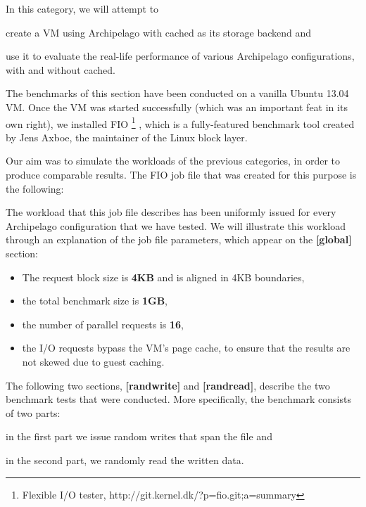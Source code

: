 In this category, we will attempt to
\begin{inparaenum}[i)]
	\item create a VM using Archipelago with cached as its storage backend 
		and
	\item use it to evaluate the real-life performance of various Archipelago 
		configurations, with and without cached.
\end{inparaenum}

The benchmarks of this section have been conducted on a vanilla Ubuntu 13.04 
VM. Once the VM was started successfully (which was an important feat in its 
own right), we installed FIO
\footnote{Flexible I/O tester, http://git.kernel.dk/?p=fio.git;a=summary}
, which is a fully-featured benchmark tool created by Jens Axboe, the 
maintainer of the Linux block layer.

Our aim was to simulate the workloads of the previous categories, in order to 
produce comparable results. The FIO job file that was created for this purpose 
is the following:


The workload that this job file describes has been uniformly issued for every
Archipelago configuration that we have tested. We will illustrate this workload 
through an explanation of the job file parameters, which appear on the 
\textbf{[global]} section:

\begin{itemize}
	\item The request block size is \textbf{4KB} and is aligned in 4KB 
		boundaries,
	\item the total benchmark size is \textbf{1GB},
	\item the number of parallel requests is \textbf{16},
	\item the I/O requests bypass the VM's page cache, to ensure that the 
		results are not skewed due to guest caching.
\end{itemize}			

The following two sections, \textbf{[randwrite]} and \textbf{[randread]}, 
describe the two benchmark tests that were conducted. More specifically, the 
benchmark consists of two parts:
\begin{inparaenum}[i)]
\item in the first part we issue random writes that span the file and
\item in the second part, we randomly read the written data.
\end{inparaenum}

